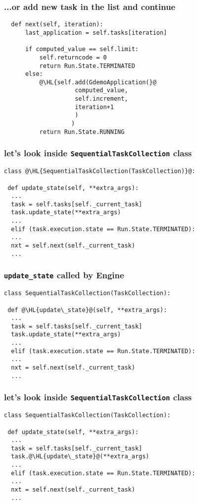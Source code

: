 \documentclass[english,serif,mathserif,xcolor=pdftex,dvipsnames,table]{beamer}
\begin{document}
\begin{frame}[fragile]
  \frametitle{...or add new task in the list and continue}
 \begin{lstlisting}
  def next(self, iteration):
      last_application = self.tasks[iteration]

      if computed_value == self.limit:
          self.returncode = 0
          return Run.State.TERMINATED
      else:
          @\HL{self.add(GdemoApplication(}@
                    computed_value, 
                    self.increment, 
                    iteration+1
                    )
                   )
          return Run.State.RUNNING
  \end{lstlisting}
\end{frame}



\begin{frame}[fragile]
  \frametitle{let's look inside \texttt{SequentialTaskCollection} class}
  \begin{lstlisting}
class @\HL{SequentialTaskCollection(TaskCollection)}@:

 def update_state(self, **extra_args):
  ...
  task = self.tasks[self._current_task]
  task.update_state(**extra_args)
  ...
  elif (task.execution.state == Run.State.TERMINATED):
  ...
  nxt = self.next(self._current_task)
  ...
  \end{lstlisting}
\end{frame}
\begin{frame}[fragile]
  \frametitle{\texttt{update\_state} called by Engine}
  \begin{lstlisting}
class SequentialTaskCollection(TaskCollection):

 def @\HL{update\_state}@(self, **extra_args):
  ...
  task = self.tasks[self._current_task]
  task.update_state(**extra_args)
  ...
  elif (task.execution.state == Run.State.TERMINATED):
  ...
  nxt = self.next(self._current_task)
  ...
  \end{lstlisting}
\end{frame}

\begin{frame}[fragile]
  \frametitle{let's look inside \texttt{SequentialTaskCollection} class}
  \begin{lstlisting}
class SequentialTaskCollection(TaskCollection):

 def update_state(self, **extra_args):
  ...
  task = self.tasks[self._current_task]
  task.@\HL{update\_state}@(**extra_args)
  ...
  elif (task.execution.state == Run.State.TERMINATED):
  ...
  nxt = self.next(self._current_task)
  ...
  \end{lstlisting}
\end{frame}
\end{document}
